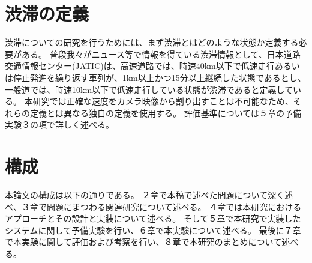 
\section{渋滞の定義}
渋滞についての研究を行うためには、まず渋滞とはどのような状態か定義する必要がある。
普段我々がニュース等で情報を得ている渋滞情報として、日本道路交通情報センター(JATIC)は、高速道路では、時速40km以下で低速走行あるいは停止発進を繰り返す車列が、1km以上かつ15分以上継続した状態であるとし、一般道では、時速10km以下で低速走行している状態が渋滞であると定義している。
本研究では正確な速度をカメラ映像から割り出すことは不可能なため、それらの定義とは異なる独自の定義を使用する。
評価基準については５章の予備実験３の項で詳しく述べる。

\section{構成}
本論文の構成は以下の通りである。
２章で本稿で述べた問題について深く述べ、３章で問題にまつわる関連研究について述べる。
４章では本研究におけるアプローチとその設計と実装について述べる。
そして５章で本研究で実装したシステムに関して予備実験を行い、６章で本実験について述べる。
最後に７章で本実験に関して評価および考察を行い、８章で本研究のまとめについて述べる。